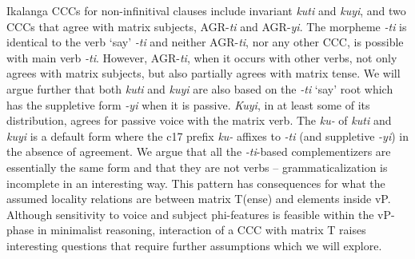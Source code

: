 \documentclass[output=paper,
modfonts
]{langscibook}
\begin{document}
Ikalanga CCCs for non-infinitival clauses include invariant \textit{kuti} and \textit{kuyi}, and two CCCs that agree with matrix subjects, AGR-\textit{ti} and AGR-\textit{yi}. The morpheme \textit{-ti} is identical to the verb ‘say’ \textit{-ti} and neither AGR-\textit{ti}, nor any other CCC, is possible with main verb \textit{-ti}. However, AGR-\textit{ti}, when it occurs with other verbs, not only agrees with matrix subjects, but also partially agrees with matrix tense. We will argue further that both \textit{kuti} and \textit{kuyi} are also based on the \textit{-ti} ‘say’ root which has the suppletive form \textit{-yi} when it is passive. \textit{Kuyi}, in at least some of its distribution, agrees for passive voice with the matrix verb. The \textit{ku-} of \textit{kuti} and \textit{kuyi} is a default form where the c17 prefix \textit{ku-} affixes to \textit{-ti} (and suppletive \textit{-yi}) in the absence of agreement.  We argue that all the \textit{-ti}-based complementizers are essentially the same form and that they are not verbs – grammaticalization is incomplete in an interesting way. This pattern has consequences for what the assumed locality relations are between matrix T(ense)  and elements inside vP. Although sensitivity to voice and subject phi-features is feasible within the vP-phase in minimalist reasoning, interaction of a CCC with matrix T raises interesting questions that require further assumptions which we will explore.
\end{document}

